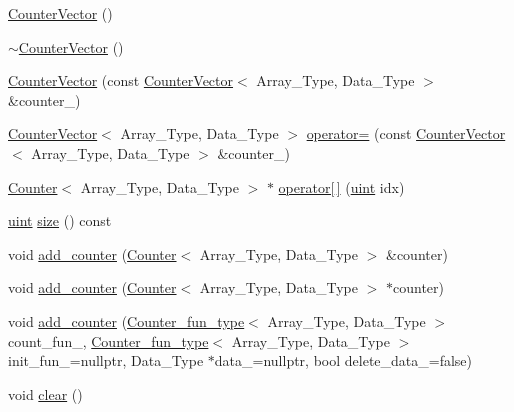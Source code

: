 \begin{DoxyCompactItemize}
\item 
\hyperlink{class_counter_vector_a536074f2ce013785e547a7bc30bc1942}{Counter\+Vector} ()
\item 
\hyperlink{class_counter_vector_ac6fc360b2df296630fb2614836dd74af}{$\sim$\+Counter\+Vector} ()
\item 
\hyperlink{class_counter_vector_aaa2e5f597feaf8569ca098be1c9069e0}{Counter\+Vector} (const \hyperlink{class_counter_vector}{Counter\+Vector}$<$ Array\+\_\+\+Type, Data\+\_\+\+Type $>$ \&counter\+\_\+)
\item 
\hyperlink{class_counter_vector}{Counter\+Vector}$<$ Array\+\_\+\+Type, Data\+\_\+\+Type $>$ \hyperlink{class_counter_vector_a2bfd2bd8e1d5a723cbc3a5538988a944}{operator=} (const \hyperlink{class_counter_vector}{Counter\+Vector}$<$ Array\+\_\+\+Type, Data\+\_\+\+Type $>$ \&counter\+\_\+)
\item 
\hyperlink{class_counter}{Counter}$<$ Array\+\_\+\+Type, Data\+\_\+\+Type $>$ $\ast$ \hyperlink{class_counter_vector_a6eac3e73298e1e6d424b92f324ffe9a8}{operator\mbox{[}$\,$\mbox{]}} (\hyperlink{typedefs_8hpp_a91ad9478d81a7aaf2593e8d9c3d06a14}{uint} idx)
\item 
\hyperlink{typedefs_8hpp_a91ad9478d81a7aaf2593e8d9c3d06a14}{uint} \hyperlink{class_counter_vector_affee3825ee1b1ce01b926f443c67f585}{size} () const
\item 
void \hyperlink{class_counter_vector_a34fda06ff678691daf3b0455c1a2af48}{add\+\_\+counter} (\hyperlink{class_counter}{Counter}$<$ Array\+\_\+\+Type, Data\+\_\+\+Type $>$ \&counter)
\item 
void \hyperlink{class_counter_vector_a062d52e18f1d3ba4c00cbf4c2d89f1e7}{add\+\_\+counter} (\hyperlink{class_counter}{Counter}$<$ Array\+\_\+\+Type, Data\+\_\+\+Type $>$ $\ast$counter)
\item 
void \hyperlink{class_counter_vector_adb32ff1af45bc05a292a5cb064dc414d}{add\+\_\+counter} (\hyperlink{typedefs_8hpp_ac0160f52f564dea3ac033b374cffbfe7}{Counter\+\_\+fun\+\_\+type}$<$ Array\+\_\+\+Type, Data\+\_\+\+Type $>$ count\+\_\+fun\+\_\+, \hyperlink{typedefs_8hpp_ac0160f52f564dea3ac033b374cffbfe7}{Counter\+\_\+fun\+\_\+type}$<$ Array\+\_\+\+Type, Data\+\_\+\+Type $>$ init\+\_\+fun\+\_\+=nullptr, Data\+\_\+\+Type $\ast$data\+\_\+=nullptr, bool delete\+\_\+data\+\_\+=false)
\item 
void \hyperlink{class_counter_vector_acce75748f917e3a7898d49a23df996e7}{clear} ()
\end{DoxyCompactItemize}


